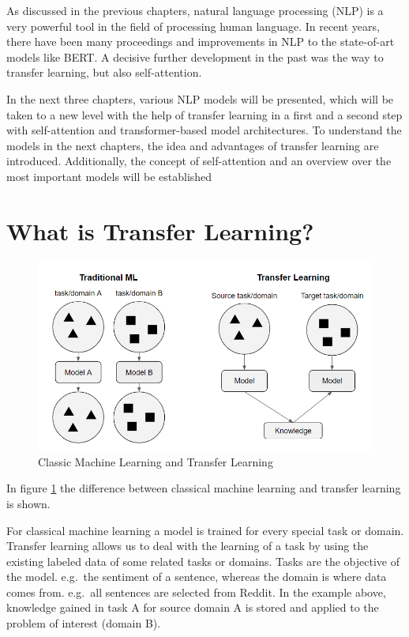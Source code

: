 \documentclass[]{krantz}
\begin{document}
As discussed in the previous chapters, natural language processing (NLP) is a very powerful tool in the field of processing human language. In recent years, there have been many proceedings and improvements in NLP to the state-of-art models like BERT. A decisive further development in the past was the way to transfer learning, but also self-attention.

In the next three chapters, various NLP models will be presented, which will be taken to a new level with the help of transfer learning in a first and a second step with self-attention and transformer-based model architectures. To understand the models in the next chapters, the idea and advantages of transfer learning are introduced. Additionally, the concept of self-attention and an overview over the most important models will be established

\hypertarget{what-is-transfer-learning}{%
\section{What is Transfer Learning?}\label{what-is-transfer-learning}}

\begin{figure}

{\centering \includegraphics[width=0.7\linewidth]{figures/02-00-transfer-learning-for-nlp/compare-classical-transferlearning-ml} 

}

\caption{Classic Machine Learning and Transfer Learning}\label{fig:ch02-figure01}
\end{figure}



In figure \ref{fig:ch02-figure01} the difference between classical machine learning and transfer learning is shown.

For classical machine learning a model is trained for every special task or domain.
Transfer learning allows us to deal with the learning of a task by using the existing labeled data of some related tasks or domains. Tasks are the objective of the model. e.g.~the sentiment of a sentence, whereas the domain is where data comes from. e.g.~all sentences are selected from Reddit. In the example above, knowledge gained in task A for source domain A is stored and applied to the problem of interest (domain B).
\end{document}
